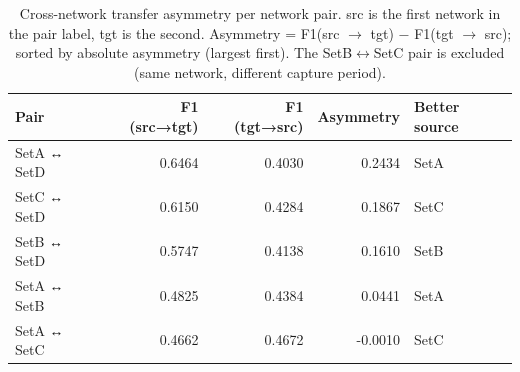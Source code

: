\begin{table}
\caption{Cross-network transfer asymmetry per network pair. src is the first network in the pair label, tgt is the second. Asymmetry = F1(src $\to$ tgt) $-$ F1(tgt $\to$ src); sorted by absolute asymmetry (largest first). The SetB$\leftrightarrow$SetC pair is excluded (same network, different capture period).}
\label{tab:q4_asymmetry}
\begin{tabular}{lrrrl}
\toprule
Pair & F1 (src→tgt) & F1 (tgt→src) & Asymmetry & Better source \\
\midrule
SetA ↔ SetD & 0.6464 & 0.4030 & 0.2434 & SetA \\
SetC ↔ SetD & 0.6150 & 0.4284 & 0.1867 & SetC \\
SetB ↔ SetD & 0.5747 & 0.4138 & 0.1610 & SetB \\
SetA ↔ SetB & 0.4825 & 0.4384 & 0.0441 & SetA \\
SetA ↔ SetC & 0.4662 & 0.4672 & -0.0010 & SetC \\
\bottomrule
\end{tabular}
\end{table}
